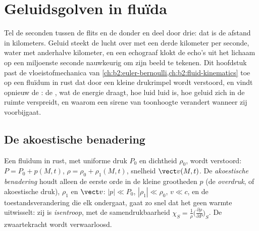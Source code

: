 \chapter{Geluidsgolven in fluïda}\label{ch:b2:sound-waves}

Tel de seconden tussen de flits en de donder en deel door drie: dat is de
afstand in kilometers. Geluid steekt de lucht over met een derde kilometer
per seconde, water met anderhalve kilometer, en een echograaf klokt de
echo's uit het lichaam op een miljoenste seconde nauwkeurig om zijn beeld te
tekenen. Dit hoofdstuk past de vloeistofmechanica van
\cref{ch:b2:euler-bernoulli,ch:b2:fluid-kinematics} toe op een fluïdum in
rust dat door een kleine drukrimpel wordt verstoord, en vindt opnieuw de
: de , wat de energie draagt, hoe
luid luid is, hoe geluid zich in de ruimte verspreidt, en waarom een sirene
van toonhoogte verandert wanneer zij voorbijgaat.

\section{De akoestische benadering}

\begin{definition}\label{def:b2:sound-waves:approximation}
Een fluïdum in rust, met uniforme druk $P_0$ en dichtheid $\rho_0$, wordt
verstoord: $P = P_0 + p(M, t)$, $\rho = \rho_0 + \rho_1(M, t)$, snelheid
$\vect v(M, t)$. De \emph{akoestische benadering} houdt alleen de eerste
orde in de kleine grootheden $p$ (de \emph{overdruk}, of akoestische druk),
$\rho_1$ en $\vect v$: $|p| \ll P_0$, $|\rho_1| \ll \rho_0$, $v \ll c$, en
de toestandsverandering die elk  ondergaat, gaat zo snel dat
het geen warmte uitwisselt: zij is \emph{isentroop}, met de
samendrukbaarheid
$\chi_S = \frac1\rho\bigl(\frac{\partial\rho}{\partial P}\bigr)_S$. De
zwaartekracht wordt verwaarloosd.
\end{definition}

